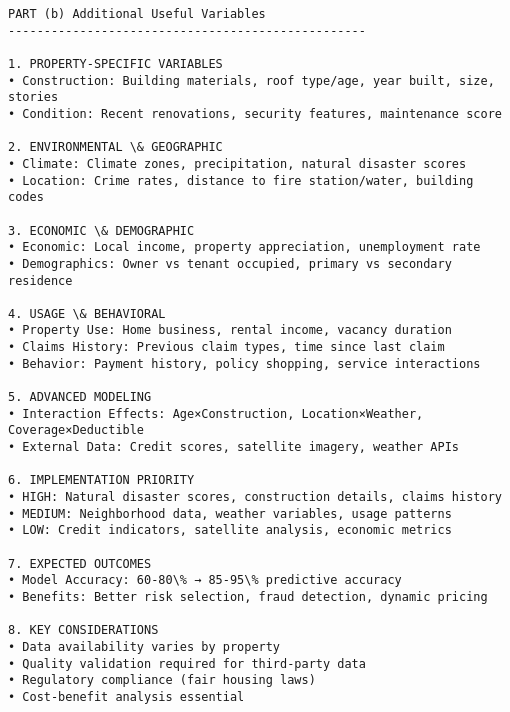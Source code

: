 \documentclass[8pt, twocolumn]{extarticle}
\begin{document}
    \begin{Verbatim}[commandchars=\\\{\}]
PART (b) Additional Useful Variables
--------------------------------------------------

1. PROPERTY-SPECIFIC VARIABLES
• Construction: Building materials, roof type/age, year built, size, stories
• Condition: Recent renovations, security features, maintenance score

2. ENVIRONMENTAL \& GEOGRAPHIC
• Climate: Climate zones, precipitation, natural disaster scores
• Location: Crime rates, distance to fire station/water, building codes

3. ECONOMIC \& DEMOGRAPHIC
• Economic: Local income, property appreciation, unemployment rate
• Demographics: Owner vs tenant occupied, primary vs secondary residence

4. USAGE \& BEHAVIORAL
• Property Use: Home business, rental income, vacancy duration
• Claims History: Previous claim types, time since last claim
• Behavior: Payment history, policy shopping, service interactions

5. ADVANCED MODELING
• Interaction Effects: Age×Construction, Location×Weather, Coverage×Deductible
• External Data: Credit scores, satellite imagery, weather APIs

6. IMPLEMENTATION PRIORITY
• HIGH: Natural disaster scores, construction details, claims history
• MEDIUM: Neighborhood data, weather variables, usage patterns
• LOW: Credit indicators, satellite analysis, economic metrics

7. EXPECTED OUTCOMES
• Model Accuracy: 60-80\% → 85-95\% predictive accuracy
• Benefits: Better risk selection, fraud detection, dynamic pricing

8. KEY CONSIDERATIONS
• Data availability varies by property
• Quality validation required for third-party data
• Regulatory compliance (fair housing laws)
• Cost-benefit analysis essential
    \end{Verbatim}
\end{document}
